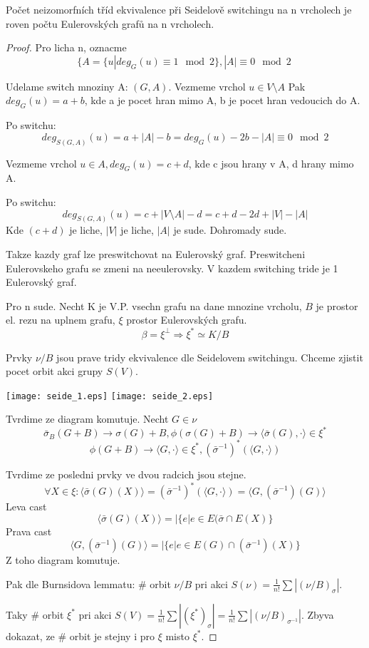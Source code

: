 \begin{theorem}
Počet neizomorfních tříd ekvivalence při Seidelově switchingu na n vrcholech je roven počtu Eulerovských grafů na n vrcholech.
\end{theorem}
\begin{proof}
Pro licha n, oznacme
\[ \{ A = \{ u | deg_G(u) \equiv 1 \mod2 \}, |A| \equiv 0 \mod2\ \]

	Udelame switch mnoziny A: $(G,A)$. Vezmeme vrchol $u \in V\setminus A$
	Pak $deg_G(u) = a + b$, kde a je pocet hran mimo A, b je pocet hran vedoucich do A.

	Po switchu:
	\[ deg_{S(G,A)}(u) = a + |A| - b = deg_G(u) - 2b - |A| \equiv 0 \mod2 \]

	Vezmeme vrchol $u \in A, deg_G(u) = c + d$, kde c jsou hrany v A, d hrany mimo A.

	Po switchu:
	\[ deg_{S(G,A)}(u) = c + |V \setminus A| - d = c + d - 2d + |V| - |A|\]
	Kde $(c + d)$ je liche, $|V|$ je liche, $|A|$ je sude. Dohromady sude.

	Takze kazdy graf lze preswitchovat na Eulerovský graf. Preswitcheni Eulerovskeho grafu se zmeni na neeulerovsky. V kazdem switching tride je 1 Eulerovský graf.

	Pro n sude. Necht K je V.P. vsechn grafu na dane mnozine vrcholu, $B$ je prostor el. rezu na uplnem grafu, $\xi$ prostor Eulerovských grafu.
	\[ \beta = \xi^{\perp} \Rightarrow \xi^{\ast} \simeq K/B \]

	Prvky $\nu/B$ jsou prave tridy ekvivalence dle Seidelovem switchingu. Chceme zjistit pocet orbit akci grupy $S(V)$.

	\texttt{[image: seide\_1.eps]}
	\texttt{[image: seide\_2.eps]}

	Tvrdime ze diagram komutuje. Necht $G \in \nu$
	\[ \bar{\sigma}_B(G + B) \to \sigma(G) + B, \phi(\sigma(G) + B) \to \langle \bar{\sigma}(G), \cdot \rangle \in \xi^{\ast} \]
	\[ \phi(G + B) \to \langle G, \cdot \rangle \in \xi^{\ast}, (\bar{\sigma}^{-1})^{\ast}(\langle G, \cdot \rangle) \]

	Tvrdime ze posledni prvky ve dvou radcich jsou stejne.
	\[ \forall X \in \xi: \langle \bar{\sigma}(G)(X) \rangle = (\bar{\sigma}^{-1})^{\ast}(\langle G, \cdot \rangle) = \langle G, (\bar{\sigma}^{-1})(G) \rangle \]
	Leva cast
	\[ \langle \bar{\sigma}(G)(X) \rangle = |\{ e | e \in E(\bar{\sigma} \cap E(X) \} \]
	Prava cast
	\[ \langle G, (\bar{\sigma}^{-1})(G) \rangle = |\{ e | e \in E(G) \cap (\bar{\sigma}^{-1})(X) \} \]
	Z toho diagram komutuje.

	Pak dle Burnsidova lemmatu: \# orbit $\nu/B$ pri akci $S(\nu) = \frac{1}{n!} \sum |(\nu/B)_{\sigma}|$.

	Taky \# orbit $\xi^{\ast}$ pri akci $S(V) = \frac{1}{n!} \sum |(\xi^{\ast})_{\sigma}| = \frac{1}{n!} \sum |(\nu/B)_{\sigma^{-1}}|$.
	Zbyva dokazat, ze \# orbit je stejny i pro $\xi$ misto $\xi^{\ast}$.

\end{proof}
